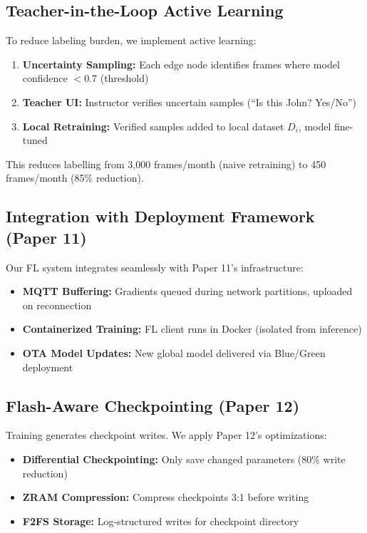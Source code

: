 \documentclass[conference]{IEEEtran}
\begin{document}
\subsection{Teacher-in-the-Loop Active Learning}

To reduce labeling burden, we implement active learning:

\begin{enumerate}
    \item \textbf{Uncertainty Sampling:} Each edge node identifies frames where model confidence $ < 0.7$ (threshold)
    \item \textbf{Teacher UI:} Instructor verifies uncertain samples (``Is this John? Yes/No'')
    \item \textbf{Local Retraining:} Verified samples added to local dataset $D_i$, model fine-tuned
\end{enumerate}

This reduces labelling from 3,000 frames/month (naive retraining) to 450 frames/month (85\% reduction).

\subsection{Integration with Deployment Framework (Paper 11)}

Our FL system integrates seamlessly with Paper 11's infrastructure:

\begin{itemize}
    \item \textbf{MQTT Buffering:} Gradients queued during network partitions, uploaded on reconnection
    \item \textbf{Containerized Training:} FL client runs in Docker (isolated from inference)
    \item \textbf{OTA Model Updates:} New global model delivered via Blue/Green deployment
\end{itemize}

\subsection{Flash-Aware Checkpointing (Paper 12)}

Training generates checkpoint writes. We apply Paper 12's optimizations:
\begin{itemize}
    \item \textbf{Differential Checkpointing:} Only save changed parameters (80\% write reduction)
    \item \textbf{ZRAM Compression:} Compress checkpoints 3:1 before writing
    \item \textbf{F2FS Storage:} Log-structured writes for checkpoint directory
\end{itemize}
\end{document}
